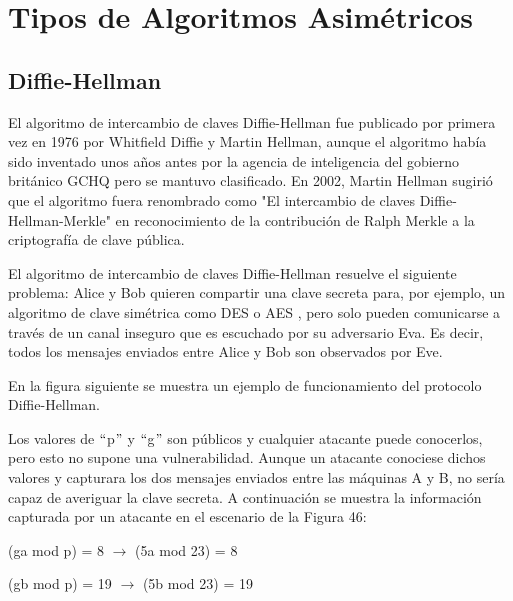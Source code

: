 \documentclass[a4paper]{article}
\begin{document}
\section{Tipos de Algoritmos Asimétricos}

\subsection{Diffie-Hellman}
El algoritmo de intercambio de claves Diffie-Hellman fue publicado por primera vez en 1976 por Whitfield Diffie y Martin Hellman, aunque el algoritmo había sido inventado unos años antes por la agencia de inteligencia del gobierno británico GCHQ pero se mantuvo clasificado. En 2002, Martin Hellman sugirió que el algoritmo fuera renombrado como "El intercambio de claves Diffie-Hellman-Merkle" en reconocimiento de la contribución de Ralph Merkle a la criptografía de clave pública.\par


\vspace{\baselineskip}
El algoritmo de intercambio de claves Diffie-Hellman resuelve el siguiente problema: Alice y Bob quieren compartir una clave secreta para, por ejemplo, un algoritmo de clave simétrica como DES o AES , pero solo pueden comunicarse a través de un canal inseguro que es escuchado por su adversario Eva. Es decir, todos los mensajes enviados entre Alice y Bob son observados por Eve.\par

En la figura siguiente se muestra un ejemplo de funcionamiento del protocolo Diffie-Hellman.\par


\vspace{\baselineskip}

\vspace{\baselineskip}
Los valores de $``$p$"$  y $``$g$"$  son públicos y cualquier atacante puede conocerlos, pero esto no supone una vulnerabilidad. Aunque un atacante conociese dichos valores y capturara los dos mensajes enviados entre las máquinas A y B, no sería capaz de averiguar la clave secreta. A continuación se muestra la información capturada por un atacante en el escenario de la Figura 46:\par


\vspace{\baselineskip}
(ga mod p) = 8 $ \rightarrow $  (5a mod 23) = 8\par

(gb mod p) = 19 $ \rightarrow $  (5b mod 23) = 19\par
\end{document}
